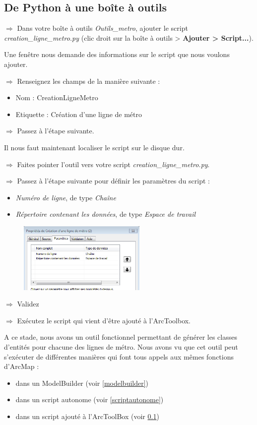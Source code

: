 \documentclass[11pt]{article}
\newcommand{\action}{$\Rightarrow$ }
\begin{document}
\subsection{De Python à une boîte à outils}
\label{scripttoolbox}
\action Dans votre boîte à outils \textit{Outils\_metro}, ajouter le script \textit{creation\_ligne\_metro.py} (clic droit sur la boîte à outils > \textbf{Ajouter > Script...}).

Une fenêtre nous demande des informations sur le script que nous voulons ajouter.

\action Renseignez les champs de la manière suivante :
\begin{itemize}
	\item Nom : CreationLigneMetro
	\item Etiquette : Création d'une ligne de métro
\end{itemize}

\action Passez à l'étape suivante.

Il nous faut maintenant localiser le script sur le disque dur.

\action Faites pointer l'outil vers votre script \textit{creation\_ligne\_metro.py}.

\action Passez à l'étape suivante pour définir les paramètres du script :
\begin{itemize}
	\item \textit{Numéro de ligne}, de type \textit{Chaîne}
	\item \textit{Répertoire contenant les données}, de type \textit{Espace de travail}
\end{itemize}

\begin{figure}[H]
	\center \includegraphics[width=0.55\textwidth]{img/td3/script_arcpy_param.png} \\
\end{figure}

\action Validez

\action Exécutez le script qui vient d'être ajouté à l'ArcToolbox.

A ce stade, nous avons un outil fonctionnel permettant de générer les classes d'entités pour chacune des lignes de métro. Nous avons vu que cet outil peut s'exécuter de différentes manières qui font tous appels aux mêmes fonctions d'ArcMap :
\begin{itemize}
	\item dans un ModelBuilder (voir \ref{modelbuilder})
	\item dans un script autonome (voir \ref{scriptautonome})
	\item dans un script ajouté à l'ArcToolBox (voir \ref{scripttoolbox})
\end{itemize}
\end{document}
